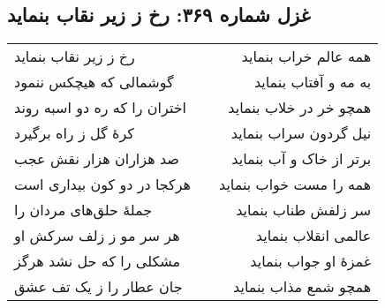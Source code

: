\begin{center}
\section*{غزل شماره ۳۶۹: رخ ز زیر نقاب بنماید}
\label{sec:369}
\begin{longtable}{l p{0.5cm} r}
رخ ز زیر نقاب بنماید
&&
همه عالم خراب بنماید
\\
گوشمالی که هیچکس ننمود
&&
به مه و آفتاب بنماید
\\
اختران را که ره دو اسبه روند
&&
همچو خر در خلاب بنماید
\\
کرهٔ گل ز راه برگیرد
&&
نیل گردون سراب بنماید
\\
صد هزاران هزار نقش عجب
&&
برتر از خاک و آب بنماید
\\
هرکجا در دو کون بیداری است
&&
همه را مست خواب بنماید
\\
جملهٔ حلق‌های مردان را
&&
سر زلفش طناب بنماید
\\
هر سر مو ز زلف سرکش او
&&
عالمی انقلاب بنماید
\\
مشکلی را که حل نشد هرگز
&&
غمزهٔ او جواب بنماید
\\
جان عطار را ز یک تف عشق
&&
همچو شمع مذاب بنماید
\\
\end{longtable}
\end{center}
